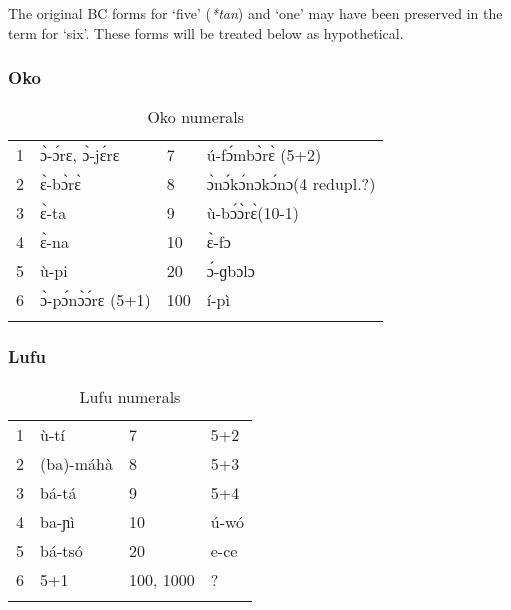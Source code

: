 The original BC forms for ‘five’ (\textit{*tan}) and ‘one’ may have been preserved in the term for ‘six’. These forms will be treated below as hypothetical.

\clearpage
\subsubsection{Oko}\label{sec:3.1.3.3}
\begin{table}
\caption{\label{tab:3:51}Oko numerals }


\begin{tabularx}{\textwidth}{lXXl}
\lsptoprule

{1} & {\`{ɔ}}-{\'{ɔ}}rɛ, {\`{ɔ}}-j{\'{ɛ}}rɛ & {7} & {\'{u}}-f{\'{ɔ}}mb{\`{ɔ}}r{\`{ɛ}} (5+2)\\
{2} & {\`{ɛ}}-b{\`{ɔ}}r{\`{ɛ}} & {8} & {\`{ɔ}}n{\'{ɔ}}k{\'{ɔ}}nɔk{\'{ɔ}}nɔ(4 redupl.?)\\
{3} & {\`{ɛ}}-ta & {9} & {\`{u}}-b{\'{ɔ}}{\`{ɔ}}r{\`{ɛ}}(10-1)\\
{4} & {\`{ɛ}}-na & {10} & {\`{ɛ}}-fɔ\\
{5} & {\`{u}}-pi & {20} & {\'{ɔ}}-ɡbɔlɔ\\
{6} & {\`{ɔ}}-p{\'{ɔ}}n{\`{ɔ}}{\'{ɔ}}rɛ (5+1) & {100} & í-pì\\
\lspbottomrule
\end{tabularx}
\end{table}

 
\subsubsection{Lufu}\label{sec:3.1.3.4}

\begin{table}
\caption{\label{tab:3:52}Lufu numerals}


\begin{tabularx}{\textwidth}{lXlX}
\lsptoprule

{1} & {\`{u}}-tí & {7} & 5+2\\
{2} & (ba)-máhà & {8} & 5+3\\
{3} & bá-tá & {9} & 5+4\\
{4} & ba-ɲì & {10} & {\'{u}}-wó\\
{5} & bá-tsó & {20} & e-ce\\
{6} & 5+1 & {100,} {1000} & ? \\
\lspbottomrule
\end{tabularx}
\end{table}

\clearpage
